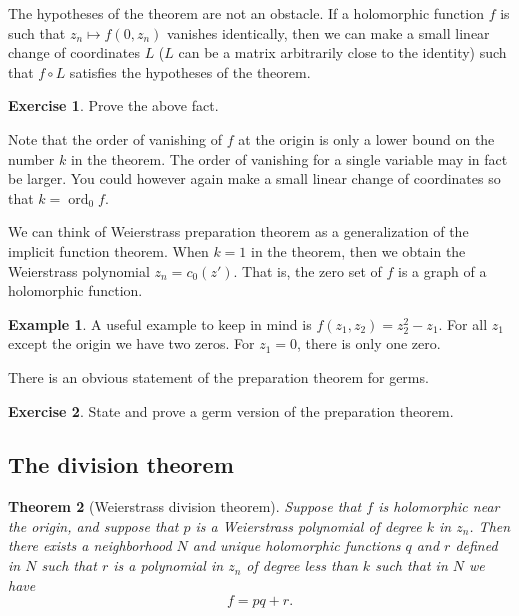 \documentclass[12pt,openany]{book}
\newcommand{\ord}{\operatorname{ord}}
\newcommand{\myindex}[1]{#1\index{#1}}
\theoremstyle{plain}
\newtheorem{thm}{Theorem}[section]
\theoremstyle{remark}
\theoremstyle{definition}
\theoremstyle{exercise}
\newtheorem{exercise}{Exercise}[section]
\theoremstyle{example}
\newtheorem{example}[thm]{Example}
\begin{document}
The hypotheses of the theorem are not an obstacle.  If a holomorphic
function $f$ is such that $z_n \mapsto f(0,z_n)$ vanishes identically,
then we can make a small linear change of
coordinates $L$ ($L$ can be a matrix arbitrarily close to the identity) such
that $f \circ L$ satisfies the hypotheses of the theorem.

\begin{exercise}
Prove the above fact.
\end{exercise}

Note that the order of vanishing of $f$ at the origin is only a lower bound
on the number $k$ in the theorem.  The order of vanishing for a single
variable may in fact be larger.  You could however again make a small linear
change of coordinates so that $k = \ord_0 f$.

We can think of Weierstrass preparation theorem as a generalization of
the implicit function theorem.  When $k=1$ in the theorem, then we obtain
the Weierstrass polynomial $z_n = c_0(z')$.  That is, the zero set of 
$f$ is a graph of a holomorphic function.

\begin{example}
A useful example to keep in mind is $f(z_1,z_2) = z_2^2 - z_1$.  For
all $z_1$ except the origin we have two zeros.  For $z_1 = 0$, there
is only one zero.
\end{example}

There is an obvious statement of the preparation theorem for germs.

\begin{exercise}
State and prove a germ version of the preparation theorem.
\end{exercise}

\subsection{The division theorem}


\begin{thm}[\myindex{Weierstrass division theorem}]
Suppose that $f$ is holomorphic near the origin, and suppose that $p$
is a Weierstrass polynomial of degree $k$ in $z_n$.  Then there exists
a neighborhood $N$ and unique holomorphic functions $q$ and $r$
defined in $N$ such that $r$ is a polynomial in $z_n$ of degree less than $k$
such that in $N$ we have
\begin{equation*}
f = pq + r .
\end{equation*}
\end{thm}
\end{document}
